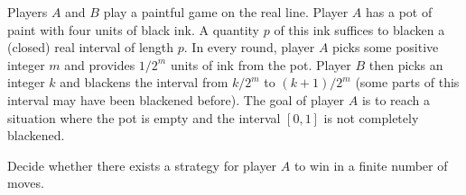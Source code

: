 Players $A$ and $B$ play a paintful game on the real line. Player $A$ has a pot of paint with four units of black ink. A quantity $p$ of this ink suffices to blacken a (closed) real interval of length $p$. In every round, player $A$ picks some positive integer $m$ and provides $1/2^m$ units of ink from the pot. Player $B$ then picks an integer $k$ and blackens the interval from $k/2^m$ to $(k+1)/2^m$ (some parts of this interval may have been blackened before). The goal of player $A$ is to reach a situation where the pot is empty and the interval $[0, 1]$ is not completely blackened.

Decide whether there exists a strategy for player $A$ to win in a finite number of moves.
